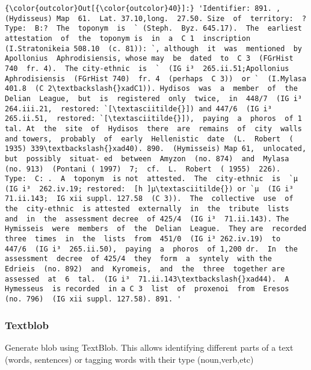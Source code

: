 \documentclass[10pt]{article}
\begin{document}
            \begin{Verbatim}[commandchars=\\\{\}]
{\color{outcolor}Out[{\color{outcolor}40}]:} 'Identifier: 891. , (Hydisseus) Map  61.  Lat. 37.10,long.  27.50. Size  of  territory:  ?  Type:  B:?  The  toponym  is  ` (Steph.  Byz. 645.17).  The  earliest  attestation  of  the  toponym is  in  a  C 1  inscription  (I.Stratonikeia 508.10  (c. 81)): `, although  it  was  mentioned  by  Apollonius  Aphrodisiensis, whose may  be  dated  to  C 3  (FGrHist 740  fr. 4).  The city-ethnic  is  `  (IG i³  265.ii.51;Apollonius Aphrodisiensis  (FGrHist 740)  fr. 4  (perhaps  C 3))  or `  (I.Mylasa 401.8  (C 2\textbackslash{}xadC1)). Hydisos  was  a  member  of  the  Delian  League,  but  is  registered  only  twice,  in  448/7  (IG i³  264.iii.21,  restored: `[\textasciitilde{}]) and 447/6  (IG i³  265.ii.51,  restored: `[\textasciitilde{}]),  paying  a  phoros  of 1  tal. At  the  site  of  Hydisos  there  are  remains  of  city  walls  and towers,  probably  of  early  Hellenistic  date  (L.  Robert  ( 1935) 339\textbackslash{}xad40). 890.  (Hymisseis) Map 61,  unlocated,  but  possibly  situat- ed  between  Amyzon  (no. 874)  and  Mylasa  (no. 913)  (Pontani ( 1997)  7;  cf.  L.  Robert  ( 1955)  226).  Type:  C: .  A  toponym  is not  attested.  The  city-ethnic  is  `µ  (IG i³  262.iv.19; restored:  [h ]µ\textasciitilde{}) or `µ  (IG i³  71.ii.143;  IG xii suppl. 127.58  (C 3)).  The  collective  use  of  the  city-ethnic  is attested  externally  in  the  tribute  lists  and  in  the  assessment decree  of 425/4  (IG i³  71.ii.143). The  Hymisseis  were  members  of  the  Delian  League.  They are  recorded  three  times  in  the  lists  from  451/0  (IG i³ 262.iv.19)  to  447/6  (IG i³  265.ii.50),  paying  a  phoros  of 1,200 dr.  In  the  assessment  decree  of 425/4  they  form  a  syntely  with the  Edrieis  (no. 892)  and  Kyromeis,  and  the  three  together are  assessed  at  6  tal.  (IG i³  71.ii.143\textbackslash{}xad44).  A  Hymesseus  is recorded  in a C 3  list  of  proxenoi  from  Eresos  (no. 796)  (IG xii suppl. 127.58). 891. '
\end{Verbatim}
        
    \subsubsection{Textblob}\label{textblob}

Generate blob using TextBlob. This allows identifying different parts of
a text (words, sentences) or tagging words with their type
(noun,verb,etc)
\end{document}
